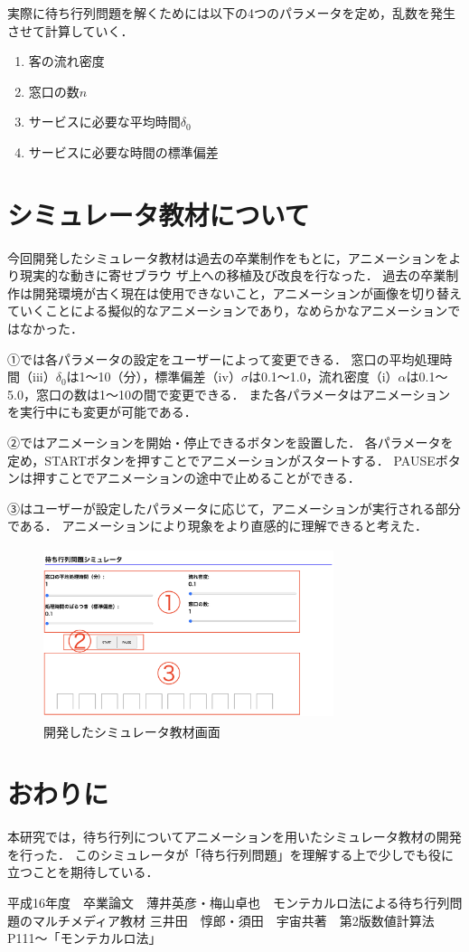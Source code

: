 \documentclass[twocolumn,10pt,a4j]{ltjsarticle}
\begin{document}
実際に待ち行列問題を解くためには以下の4つのパラメータを定め，乱数を発生させて計算していく．
\begin{enumerate}
\renewcommand{\labelenumi}{(\roman{enumi})}
\item 客の流れ密度\alpha
\item 窓口の数$n$
\item サービスに必要な平均時間$\delta_0$
\item サービスに必要な時間の標準偏差\sigma
\end{enumerate}


\section{シミュレータ教材について}
今回開発したシミュレータ教材は過去の卒業制作をもとに，アニメーションをより現実的な動きに寄せブラウ ザ上への移植及び改良を行なった．
過去の卒業制作は開発環境が古く現在は使用できないこと，アニメーションが画像を切り替えていくことによる擬似的なアニメーションであり，なめらかなアニメーションではなかった．

①では各パラメータの設定をユーザーによって変更できる．
窓口の平均処理時間（iii）$\delta_0$は1〜10（分），標準偏差（iv）$\sigma$は0.1〜1.0，流れ密度（i）$\alpha$は0.1〜5.0，窓口の数は1〜10の間で変更できる．
また各パラメータはアニメーションを実行中にも変更が可能である．

②ではアニメーションを開始・停止できるボタンを設置した．
各パラメータを定め，STARTボタンを押すことでアニメーションがスタートする．
PAUSEボタンは押すことでアニメーションの途中で止めることができる．

③はユーザーが設定したパラメータに応じて，アニメーションが実行される部分である．
アニメーションにより現象をより直感的に理解できると考えた．

\begin{figure}[h]
\begin{center}
\includegraphics[clip,width=85mm,height=50mm]{figures/layout0113.pdf}
\end{center}
\caption{開発したシミュレータ教材画面}
\label{fig:教科書}
\end{figure}

\section{おわりに}
本研究では，待ち行列についてアニメーションを用いたシミュレータ教材の開発を行った．
このシミュレータが「待ち行列問題」を理解する上で少しでも役に立つことを期待している．
\begin{thebibliography}{99}
平成16年度　卒業論文　薄井英彦・梅山卓也　モンテカルロ法による待ち行列問題のマルチメディア教材
 三井田　惇郎・須田　宇宙共著　第2版数値計算法P111〜「モンテカルロ法」　
 \end{thebibliography}
\end{document}
